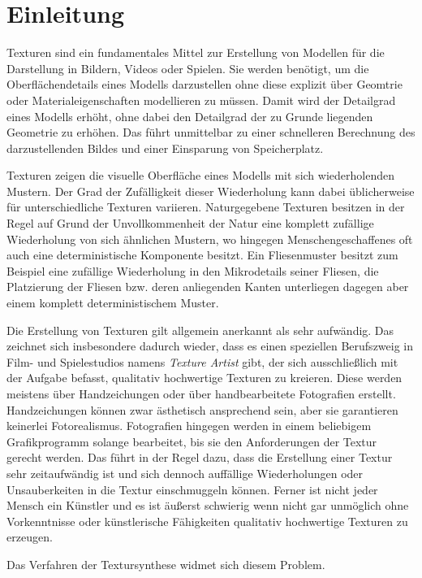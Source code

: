 \section{Einleitung}

Texturen sind ein fundamentales Mittel zur Erstellung von Modellen für die Darstellung in Bildern, Videos oder Spielen.
Sie werden benötigt, um die Oberflächendetails eines Modells darzustellen ohne diese explizit über Geomtrie oder Materialeigenschaften modellieren zu müssen.
Damit wird der Detailgrad eines Modells erhöht, ohne dabei den Detailgrad der zu Grunde liegenden Geometrie zu erhöhen.
Das führt unmittelbar zu einer schnelleren Berechnung des darzustellenden Bildes und einer Einsparung von Speicherplatz.

Texturen zeigen die visuelle Oberfläche eines Modells mit sich wiederholenden Mustern.
Der Grad der Zufälligkeit dieser Wiederholung kann dabei üblicherweise für unterschiedliche Texturen variieren.
Naturgegebene Texturen besitzen in der Regel auf Grund der Unvollkommenheit der Natur eine komplett zufällige Wiederholung von sich ähnlichen Mustern, wo hingegen Menschengeschaffenes oft auch eine deterministische Komponente besitzt.
Ein Fliesenmuster besitzt zum Beispiel eine zufällige Wiederholung in den Mikrodetails seiner Fliesen, die Platzierung der Fliesen bzw. deren anliegenden Kanten unterliegen dagegen aber einem komplett deterministischem Muster.

Die Erstellung von Texturen gilt allgemein anerkannt als sehr aufwändig.
Das zeichnet sich insbesondere dadurch wieder, dass es einen speziellen Berufszweig in Film- und Spielestudios namens \emph{Texture Artist} gibt, der sich ausschließlich mit der Aufgabe befasst, qualitativ hochwertige Texturen zu kreieren.
Diese werden meistens über Handzeichungen oder über handbearbeitete Fotografien erstellt.
Handzeichungen können zwar ästhetisch ansprechend sein, aber sie garantieren keinerlei Fotorealismus.
Fotografien hingegen werden in einem beliebigem Grafikprogramm solange bearbeitet, bis sie den Anforderungen der Textur gerecht werden.
Das führt in der Regel dazu, dass die Erstellung einer Textur sehr zeitaufwändig ist und sich dennoch auffällige Wiederholungen oder Unsauberkeiten in die Textur einschmuggeln können.
Ferner ist nicht jeder Mensch ein Künstler und es ist äußerst schwierig wenn nicht gar unmöglich ohne Vorkenntnisse oder künstlerische Fähigkeiten qualitativ hochwertige Texturen zu erzeugen.

Das Verfahren der Textursynthese widmet sich diesem Problem.
